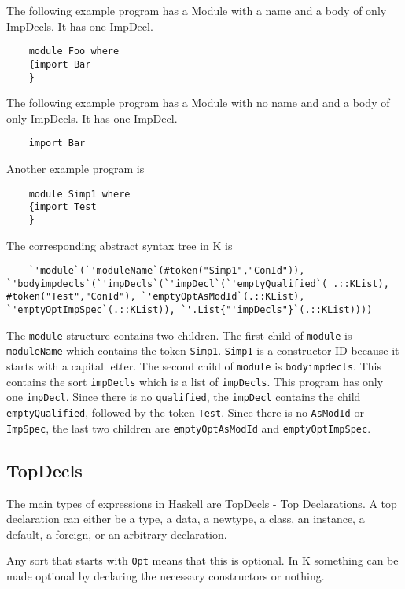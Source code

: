 \noindent
The following example program has a Module with a name and a body of only ImpDecls. It has one ImpDecl.

\begin{lstlisting}
	module Foo where
	{import Bar
	}
\end{lstlisting}

\noindent
The following example program has a Module with no name and and a body of only ImpDecls. It has one ImpDecl.

\begin{lstlisting}
	import Bar
\end{lstlisting}

\noindent
Another example program is
\begin{lstlisting}
	module Simp1 where
	{import Test
	}
\end{lstlisting}

\noindent
The corresponding abstract syntax tree in K is
\begin{lstlisting}
	`'module`(`'moduleName`(#token("Simp1","ConId")), `'bodyimpdecls`(`'impDecls`(`'impDecl`(`'emptyQualified`( .::KList), #token("Test","ConId"), `'emptyOptAsModId`(.::KList), `'emptyOptImpSpec`(.::KList)), `'.List{"'impDecls"}`(.::KList))))
\end{lstlisting}

The \texttt{module} structure contains two children. The first child of \texttt{module} is \texttt{moduleName} which contains the token \texttt{Simp1}. \texttt{Simp1} is a constructor ID because it starts with a capital letter. The second child of \texttt{module} is \texttt{bodyimpdecls}. This contains the sort \texttt{impDecls} which is a list of \texttt{impDecls}. This program has only one \texttt{impDecl}. Since there is no \texttt{qualified}, the \texttt{impDecl} contains the child \texttt{emptyQualified}, followed by the token \texttt{Test}. Since there is no \texttt{AsModId} or \texttt{ImpSpec}, the last two children are \texttt{emptyOptAsModId} and \texttt{emptyOptImpSpec}.

\subsection{TopDecls}
The main types of expressions in Haskell are TopDecls - Top Declarations. A top declaration can either be a type, a data, a newtype, a class, an instance, a default, a foreign, or an arbitrary declaration.

Any sort that starts with \texttt{Opt} means that this is optional. In K something can be made optional by declaring the necessary constructors or nothing.


